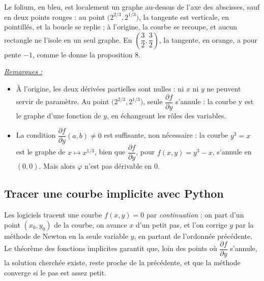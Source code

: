 \documentclass[a4paper,twoside]{report}
\newenvironment{remarques}%
 {\par\needspace{6\baselineskip}\vspace{1mm}\begin{list}{}{\leftmargin=1cm \rightmargin=0.5cm}\item[]%
  \textit{\underline{Remarques :}}%
  \begin{itemize}[label=$\bullet$,leftmargin=0.45cm,topsep=3pt,itemsep=4pt]}%
 {\end{itemize}\end{list}\vspace{1mm}}
\newcommand{\dpd}[2]{\dfrac{\partial #1}{\partial #2}}  %
\begin{document}
\begin{center}
\end{center}

\noindent Le folium, en bleu, est localement un graphe au-dessus de l'axe des abscisses, sauf en deux points rouges : au point $\big(2^{2/3}, 2^{1/3}\big)$, la tangente est verticale, en pointillés, et la boucle se replie ; à l'origine, la courbe se recoupe, et aucun rectangle ne l'isole en un seul graphe. En $\left(\dfrac{3}{2}, \dfrac{3}{2}\right)$, la tangente, en orange, a pour pente $-1$, comme le donne la proposition 8.

\begin{remarques}
  \item À l'origine, les deux dérivées partielles sont nulles : ni $x$ ni $y$ ne peuvent servir de paramètre. Au point $\big(2^{2/3}, 2^{1/3}\big)$, seule $\dpd{f}{y}$ s'annule : la courbe y est le graphe d'une fonction de $y$, en échangeant les rôles des variables.
  \item La condition $\dpd{f}{y}(a, b) \neq 0$ est suffisante, non nécessaire : la courbe $y^{3} = x$ est le graphe de $x \mapsto x^{1/3}$, bien que $\dpd{f}{y}$, pour $f(x, y) = y^{3} - x$, s'annule en $(0, 0)$. Mais alors $\varphi$ n'est pas dérivable en $0$.
\end{remarques}

\subsection{Tracer une courbe implicite avec Python}

Les logiciels tracent une courbe $f(x, y) = 0$ par \emph{continuation} : on part d'un point $(x_{0}, y_{0})$ de la courbe, on avance $x$ d'un petit pas, et l'on corrige $y$ par la méthode de Newton en la seule variable $y$, en partant de l'ordonnée précédente. Le théorème des fonctions implicites garantit que, loin des points où $\dpd{f}{y}$ s'annule, la solution cherchée existe, reste proche de la précédente, et que la méthode converge si le pas est assez petit.
\end{document}

